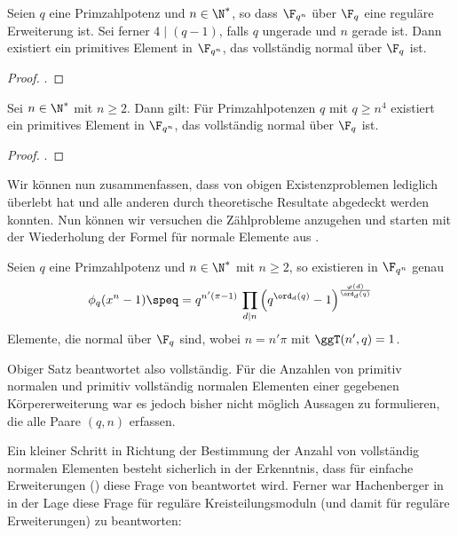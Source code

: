 \begin{satz}
  \label{satz:pcn_in_regular}
  Seien $q$ eine Primzahlpotenz und $n \in \N^\ast$, so dass
  $\F_{q^n}$ über $\F_q$ eine reguläre Erweiterung ist. Sei ferner
  $4\mid (q-1)$, falls $q$ ungerade und $n$ gerade ist. Dann existiert ein
  primitives Element in $\F_{q^n}$, das vollständig normal über $\F_q$ ist.
\end{satz}
\begin{proof}
  \autocite[Theorem 1.4]{hachenberger2001}.
\end{proof}


\begin{satz}
  \label{satz:pcn_schranke}
  Sei $n\in \N^\ast$ mit $n\geq 2$. Dann gilt:
  Für Primzahlpotenzen $q$ mit $q \geq n^4$ existiert ein primitives Element in 
  $\F_{q^n}$, das vollständig normal über $\F_q$ ist.
\end{satz}
\begin{proof}
  \autocite[Theorem 2]{hachenberger2014}.
\end{proof}

Wir können nun zusammenfassen, dass von obigen Existenzproblemen lediglich
 überlebt hat und alle anderen durch theoretische Resultate
abgedeckt werden konnten. Nun können wir versuchen die Zählprobleme anzugehen
und starten mit der Wiederholung der Formel für normale Elemente aus
.

\begin{satz}
  Seien $q$ eine Primzahlpotenz und $n\in \N^\ast$ mit $n\geq 2$, so existieren
  in $\F_{q^n}$ genau 
  \[ \phi_q(x^n-1) \speq= q^{n'(\pi-1)}\,\prod_{d\mid n}
    \left( q^{\ord_d(q)} -1 \right)^{\frac{\varphi(d)}{\ord_d(q)}}\]
  Elemente, die normal über $\F_q$ sind, wobei $n = n'\pi$ mit $\ggT(n',q) = 1$.
\end{satz}

Obiger Satz beantwortet also  vollständig. Für die Anzahlen von 
primitiv normalen und primitiv vollständig normalen Elementen einer gegebenen
Körpererweiterung war es jedoch bisher nicht möglich Aussagen zu formulieren,
die alle Paare $(q,n)$ erfassen.

Ein kleiner Schritt in Richtung der Bestimmung der 
Anzahl von vollständig normalen Elementen 
besteht sicherlich in der Erkenntnis, dass für einfache Erweiterungen
() diese Frage von  beantwortet
wird. Ferner war Hachenberger in \autocite[Section 21]{hachenberger1997finite}
in der Lage diese Frage für reguläre Kreisteilungsmoduln (und damit für
reguläre Erweiterungen) zu beantworten:


